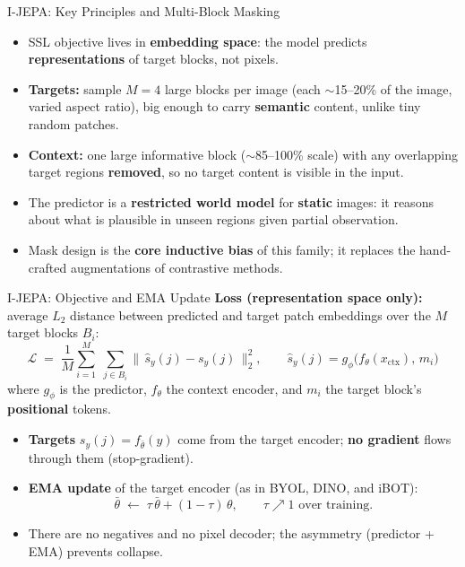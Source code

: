 \begin{frame}{I-JEPA: Key Principles and Multi-Block Masking}
  \begin{itemize}\itemsep0.28em
    \item SSL objective lives in \textbf{embedding space}: the model predicts \textbf{representations} of target blocks, not pixels.
    \item \textbf{Targets:} sample $M{=}4$ large blocks per image (each $\sim$15--20\% of the image, varied aspect ratio), big enough to carry \textbf{semantic} content, unlike tiny random patches.
    \item \textbf{Context:} one large informative block ($\sim$85--100\% scale) with any overlapping target regions \textbf{removed}, so no target content is visible in the input.
    \item The predictor is a \textbf{restricted world model} for \textbf{static} images: it reasons about what is plausible in unseen regions given partial observation.
    \item Mask design is the \textbf{core inductive bias} of this family; it replaces the hand-crafted augmentations of contrastive methods.
  \end{itemize}
\end{frame}

\begin{frame}{I-JEPA: Objective and EMA Update}
  \textbf{Loss (representation space only):} average $L_2$ distance between predicted and target patch embeddings over the $M$ target blocks $B_i$:
  \begin{equation*}
    \mathcal{L} \;=\; \frac{1}{M}\sum_{i=1}^{M} \;\sum_{j \in B_i} \big\lVert\, \hat{s}_{y}(j) - s_{y}(j) \,\big\rVert_2^2 ,
    \qquad \hat{s}_{y}(j) = g_\phi\!\big(f_\theta(x_{\text{ctx}}),\, m_i\big)
  \end{equation*}
  where $g_\phi$ is the predictor, $f_\theta$ the context encoder, and $m_i$ the target block's \textbf{positional} tokens.
  \vspace{0.4em}
  \begin{itemize}\itemsep0.25em
    \item \textbf{Targets} $s_y(j) = f_{\bar\theta}(y)$ come from the target encoder; \textbf{no gradient} flows through them (stop-gradient).
    \item \textbf{EMA update} of the target encoder (as in BYOL, DINO, and iBOT):
    \begin{equation*}
      \bar\theta \;\leftarrow\; \tau\,\bar\theta + (1-\tau)\,\theta, \qquad \tau \nearrow 1 \text{ over training.}
    \end{equation*}
    \item There are no negatives and no pixel decoder; the asymmetry (predictor + EMA) prevents collapse.
  \end{itemize}
\end{frame}

